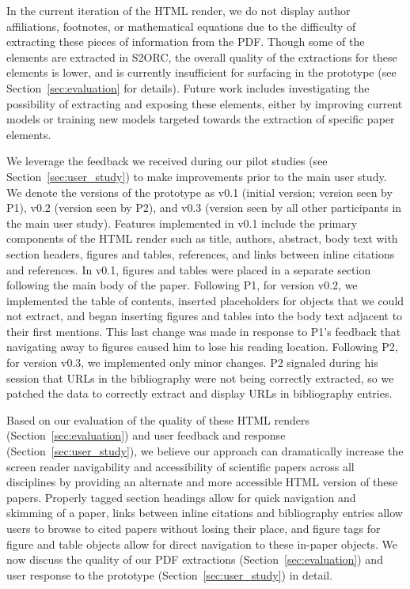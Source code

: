 In the current iteration of the HTML render, we do not display author affiliations, footnotes, or mathematical equations due to the difficulty of extracting these pieces of information from the PDF. Though some of the elements are extracted in S2ORC, the overall quality of the extractions for these elements is lower, and is currently insufficient for surfacing in the prototype (see Section~\ref{sec:evaluation} for details). Future work includes investigating the possibility of extracting and exposing these elements, either by improving current models or training new models targeted towards the extraction of specific paper elements.

We leverage the feedback we received during our pilot studies (see Section~\ref{sec:user_study}) to make improvements prior to the main user study. We denote the versions of the prototype as v0.1 (initial version; version seen by P1), v0.2 (version seen by P2), and v0.3 (version seen by all other participants in the main user study). Features implemented in v0.1 include the primary components of the HTML render such as title, authors, abstract, body text with section headers, figures and tables, references, and links between inline citations and references. In v0.1, figures and tables were placed in a separate section following the main body of the paper. Following P1, for version v0.2, we implemented the table of contents, inserted placeholders for objects that we could not extract, and began inserting figures and tables into the body text adjacent to their first mentions. This last change was made in response to P1's feedback that navigating away to figures caused him to lose his reading location. Following P2, for version v0.3, we implemented only minor changes. P2 signaled during his session that URLs in the bibliography were not being correctly extracted, so we patched the data to correctly extract and display URLs in bibliography entries.

Based on our evaluation of the quality of these HTML renders (Section~\ref{sec:evaluation}) and user feedback and response (Section~\ref{sec:user_study}), we believe our approach can dramatically increase the screen reader navigability and accessibility of scientific papers across all disciplines by providing an alternate and more accessible HTML version of these papers. Properly tagged section headings allow for quick navigation and skimming of a paper, links between inline citations and bibliography entries allow users to browse to cited papers without losing their place, and figure tags for figure and table objects allow for direct navigation to these in-paper objects. We now discuss the quality of our PDF extractions (Section~\ref{sec:evaluation}) and user response to the prototype (Section~\ref{sec:user_study}) in detail.